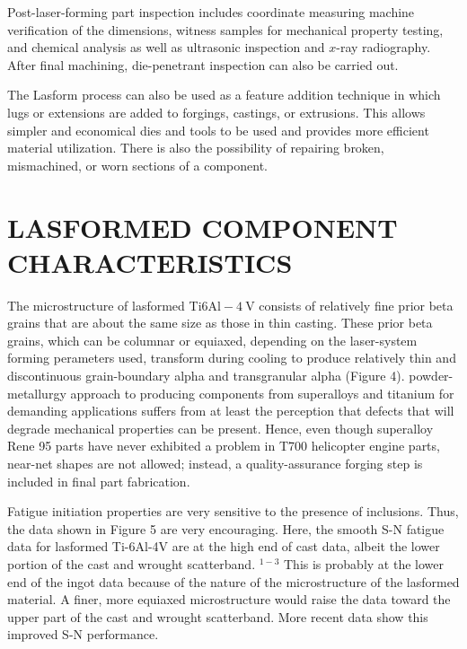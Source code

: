 \documentclass[10pt]{article}
\begin{document}
Post-laser-forming part inspection includes coordinate measuring machine verification of the dimensions, witness samples for mechanical property testing, and chemical analysis as well as ultrasonic inspection and $x$-ray radiography. After final machining, die-penetrant inspection can also be carried out.

The Lasform process can also be used as a feature addition technique in which lugs or extensions are added to forgings, castings, or extrusions. This allows simpler and economical dies and tools to be used and provides more efficient material utilization. There is also the possibility of repairing broken, mismachined, or worn sections of a component.

\section*{LASFORMED COMPONENT CHARACTERISTICS}
The microstructure of lasformed Ti$6 \mathrm{Al}-4 \mathrm{~V}$ consists of relatively fine prior beta grains that are about the same size as those in thin casting. These prior beta grains, which can be columnar or equiaxed, depending on the laser-system forming perameters used, transform during cooling to produce relatively thin and discontinuous grain-boundary alpha and transgranular alpha (Figure 4). powder-metallurgy approach to producing components from superalloys and titanium for demanding applications suffers from at least the perception that defects that will degrade mechanical properties can be present. Hence, even though superalloy Rene 95 parts have never exhibited a problem in T700 helicopter engine parts, near-net shapes are not allowed; instead, a quality-assurance forging step is included in final part fabrication.

Fatigue initiation properties are very sensitive to the presence of inclusions. Thus, the data shown in Figure 5 are very encouraging. Here, the smooth S-N fatigue data for lasformed Ti-6Al-4V are at the high end of cast data, albeit the lower portion of the cast and wrought scatterband. ${ }^{1-3}$ This is probably at the lower end of the ingot data because of the nature of the microstructure of the lasformed material. A finer, more equiaxed microstructure would raise the data toward the upper part of the cast and wrought scatterband. More recent data show this improved S-N performance.
\end{document}
